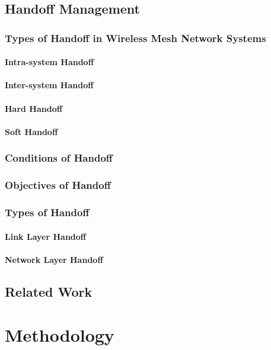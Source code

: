 \documentclass[11pt,a4paper]{report}
\begin{document}
\section{Handoff Management}
\subsection{Types of Handoff in Wireless Mesh Network Systems}
\subsubsection{Intra-system Handoff}
\subsubsection{Inter-system Handoff}
\subsubsection{Hard Handoff}
\subsubsection{Soft Handoff}

\newpage
\subsection{Conditions of Handoff}
\subsection{Objectives of Handoff}
\subsection{Types of Handoff}
\subsubsection{Link Layer Handoff}
\subsubsection{Network Layer Handoff}

\section{Related Work}

\chapter{Methodology}
\end{document}

